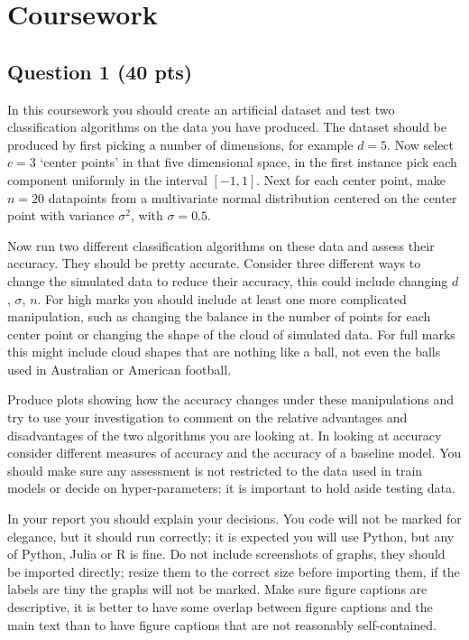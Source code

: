 \documentclass[12pt]{article}
\begin{document}
\section*{Coursework }

\subsection*{Question 1 (40 pts)}

In this coursework you should create an artificial dataset and test
two classification algorithms on the data you have produced. The
dataset should be produced by first picking a number of dimensions, for
example $d=5$. Now select $c=3$ `center points' in that five
dimensional space, in the first instance pick each component uniformly
in the interval $[-1,1]$. Next for each center point, make $n=20$
datapoints from a multivariate normal distribution centered on the
center point with variance $\sigma^2$, with $\sigma=0.5$.

Now run two different classification algorithms on these data and
assess their accuracy. They should be pretty accurate. Consider three
different ways to change the simulated data to reduce their accuracy,
this could include changing $d$, $\sigma$, $n$. For high marks you
should include at least one more complicated manipulation, such as changing the
balance in the number of points for each center point or changing the
shape of the cloud of simulated data. For full marks this might
include cloud shapes that are nothing like a ball, not even the balls used
in Australian or American football.

Produce plots showing how the accuracy changes under these
manipulations and try to use your investigation to comment on the
relative advantages and disadvantages of the two algorithms you are
looking at. In looking at accuracy consider different measures of
accuracy and the accuracy of a baseline model. You should make sure
any assessment is not restricted to the data used in train models or
decide on hyper-parameters: it is important to hold aside testing
data.

In your report you should explain your decisions. You code will not be
marked for elegance, but it should run correctly; it is expected you
will use Python, but any of Python, Julia or R is fine. Do not include
screenshots of graphs, they should be imported directly; resize them
to the correct size before importing them, if the labels are tiny the
graphs will not be marked. Make sure figure captions are descriptive,
it is better to have some overlap between figure captions and the main
text than to have figure captions that are not reasonably
self-contained.
\end{document}
